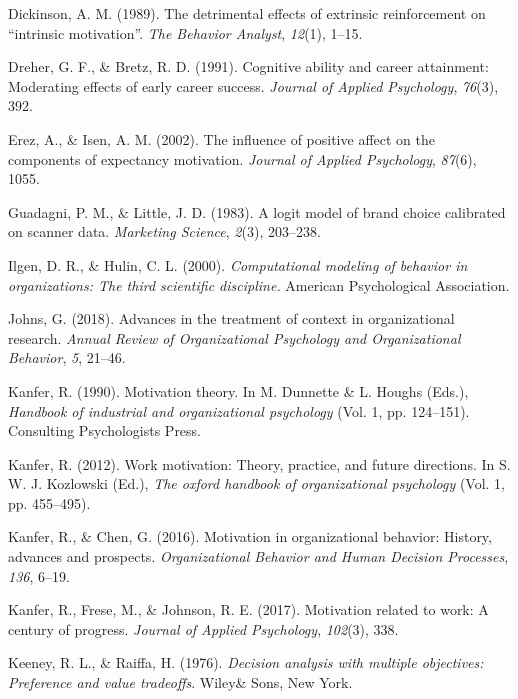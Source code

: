 \documentclass[english,,man]{apa6}
\theoremstyle{definition}
\theoremstyle{definition}
\theoremstyle{definition}
\theoremstyle{remark}
\begin{document}
\leavevmode\hypertarget{ref-dickinson1989}{}%
Dickinson, A. M. (1989). The detrimental effects of extrinsic
reinforcement on ``intrinsic motivation''. \emph{The Behavior Analyst},
\emph{12}(1), 1--15.

\leavevmode\hypertarget{ref-dreher1991}{}%
Dreher, G. F., \& Bretz, R. D. (1991). Cognitive ability and career
attainment: Moderating effects of early career success. \emph{Journal of
Applied Psychology}, \emph{76}(3), 392.

\leavevmode\hypertarget{ref-erez2002}{}%
Erez, A., \& Isen, A. M. (2002). The influence of positive affect on the
components of expectancy motivation. \emph{Journal of Applied
Psychology}, \emph{87}(6), 1055.

\leavevmode\hypertarget{ref-guadagni1983}{}%
Guadagni, P. M., \& Little, J. D. (1983). A logit model of brand choice
calibrated on scanner data. \emph{Marketing Science}, \emph{2}(3),
203--238.

\leavevmode\hypertarget{ref-Ilgen2000}{}%
Ilgen, D. R., \& Hulin, C. L. (2000). \emph{Computational modeling of
behavior in organizations: The third scientific discipline.} American
Psychological Association.

\leavevmode\hypertarget{ref-johns2018advances}{}%
Johns, G. (2018). Advances in the treatment of context in organizational
research. \emph{Annual Review of Organizational Psychology and
Organizational Behavior}, \emph{5}, 21--46.

\leavevmode\hypertarget{ref-kanfermotivation}{}%
Kanfer, R. (1990). Motivation theory. In M. Dunnette \& L. Houghs
(Eds.), \emph{Handbook of industrial and organizational psychology}
(Vol. 1, pp. 124--151). Consulting Psychologists Press.

\leavevmode\hypertarget{ref-kanfer2012work}{}%
Kanfer, R. (2012). Work motivation: Theory, practice, and future
directions. In S. W. J. Kozlowski (Ed.), \emph{The oxford handbook of
organizational psychology} (Vol. 1, pp. 455--495).

\leavevmode\hypertarget{ref-kanfer2016motivation}{}%
Kanfer, R., \& Chen, G. (2016). Motivation in organizational behavior:
History, advances and prospects. \emph{Organizational Behavior and Human
Decision Processes}, \emph{136}, 6--19.

\leavevmode\hypertarget{ref-kanfer2017motivation}{}%
Kanfer, R., Frese, M., \& Johnson, R. E. (2017). Motivation related to
work: A century of progress. \emph{Journal of Applied Psychology},
\emph{102}(3), 338.

\leavevmode\hypertarget{ref-keeney1976}{}%
Keeney, R. L., \& Raiffa, H. (1976). \emph{Decision analysis with
multiple objectives: Preference and value tradeoffs}. Wiley\& Sons, New
York.
\end{document}
